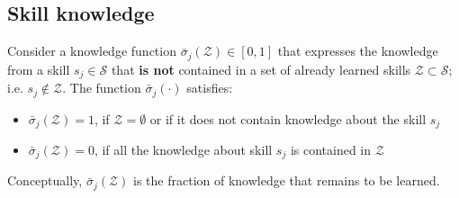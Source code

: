 \subsection{Skill knowledge}
Consider a knowledge function $\bar{\sigma}_j(\mathcal{Z})\in [0,1]$ that expresses the knowledge from a skill  $s_j \in \mathcal{S}$ that \textbf{is not} contained in a set of already learned skills $\mathcal{Z} \subset \mathcal{S}$; i.e. $s_j \notin \mathcal{Z}$. The function $\bar{\sigma}_j(\cdot)$ satisfies:
\begin{itemize}
	\item $\bar{\sigma}_j(\mathcal{Z}) = 1$, if $\mathcal{Z}=\emptyset$ or if it does not contain knowledge about the skill $s_j$
	\item $\bar{\sigma}_j(\mathcal{Z}) = 0$, if all the knowledge about skill $s_j$ is contained in $\mathcal{Z}$
\end{itemize} 
Conceptually, $\bar{\sigma}_j(\mathcal{Z})$ is the fraction of knowledge that remains to be learned.
